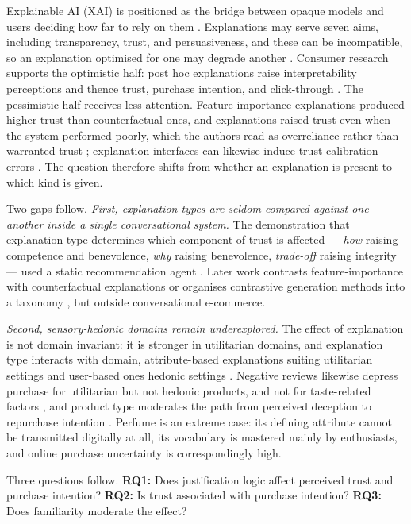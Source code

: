 \documentclass[conference]{IEEEtran}
\begin{document}
Explainable AI (XAI) is positioned as the bridge between opaque models and users deciding
how far to rely on them \cite{rong2024}. Explanations may serve seven aims, including
transparency, trust, and persuasiveness, and these can be incompatible, so an explanation
optimised for one may degrade another \cite{tintarev2012}. Consumer research supports the
optimistic half: post hoc explanations raise interpretability perceptions and thence trust,
purchase intention, and click-through \cite{chen2024}. The pessimistic half receives less
attention. Feature-importance explanations produced higher trust than counterfactual ones,
and explanations raised trust even when the system performed poorly, which the authors read
as overreliance rather than warranted trust \cite{brito2023}; explanation interfaces can
likewise induce trust calibration errors \cite{naiseh2021}. The question therefore shifts
from whether an explanation is present to which kind is given.

Two gaps follow. \textit{First, explanation types are seldom compared against one another
inside a single conversational system.} The demonstration that explanation type determines
which component of trust is affected --- \textit{how} raising competence and benevolence,
\textit{why} raising benevolence, \textit{trade-off} raising integrity --- used a static
recommendation agent \cite{wang2007}. Later work contrasts feature-importance with
counterfactual explanations \cite{brito2023} or organises contrastive generation methods
into a taxonomy \cite{stepin2021}, but outside conversational e-commerce.

\textit{Second, sensory-hedonic domains remain underexplored.} The effect of explanation is
not domain invariant: it is stronger in utilitarian domains, and explanation type interacts
with domain, attribute-based explanations suiting utilitarian settings and user-based ones
hedonic settings \cite{chen2024}. Negative reviews likewise depress purchase for
utilitarian but not hedonic products, and not for taste-related factors \cite{varga2024},
and product type moderates the path from perceived deception to repurchase intention
\cite{wangx2022}. Perfume is an extreme case: its defining attribute cannot be transmitted
digitally at all, its vocabulary is mastered mainly by enthusiasts, and online purchase
uncertainty is correspondingly high.

Three questions follow. \textbf{RQ1:} Does justification logic affect perceived trust and
purchase intention? \textbf{RQ2:} Is trust associated with purchase intention?
\textbf{RQ3:} Does familiarity moderate the effect?
\end{document}
